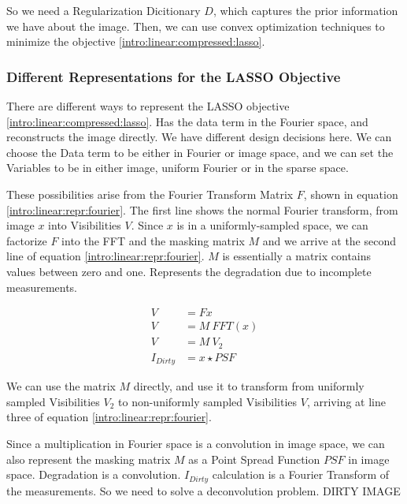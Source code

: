 So we need a Regularization Dicitionary $D$, which captures the prior information we have about the image. Then, we can use convex optimization techniques to minimize the objective \eqref{intro:linear:compressed:lasso}.






\subsubsection{Different Representations for the LASSO Objective}\label{intro:linear:repr}

There are different ways to represent the LASSO objective \eqref{intro:linear:compressed:lasso}. Has the data term in the Fourier space, and reconstructs the image directly. We have different design decisions here. We can choose the Data term to be either in Fourier or image space, and we can set the Variables to be in either image, uniform Fourier or in the sparse space.

These possibilities arise from the Fourier Transform Matrix $F$, shown in equation \eqref{intro:linear:repr:fourier}. The first line shows the normal Fourier transform, from image $x$ into Visibilities $V$. Since $x$ is in a uniformly-sampled space, we can factorize $F$ into the FFT and the masking matrix $M$ and we arrive at the second line of equation \eqref{intro:linear:repr:fourier}. $M$ is essentially a matrix contains values between zero and one.
Represents the degradation due to incomplete measurements. 

\begin{equation} \label{intro:linear:repr:fourier}
\begin{split}
V &= Fx\\
V &= M\: FFT(x)\\
V &= M\: V_2\\
I_{Dirty} &= x \star PSF
\end{split}
\end{equation}

We can use the matrix $M$ directly, and use it to transform from uniformly sampled Visibilities $V_2$ to non-uniformly sampled Visibilities $V$, arriving at line three of equation \eqref{intro:linear:repr:fourier}.

Since a multiplication in Fourier space is a convolution in image space, we can also represent the masking matrix $M$ as a Point Spread Function $PSF$ in image space. Degradation is a convolution. $I_{Dirty}$ calculation is a Fourier Transform of the measurements. So we need to solve a deconvolution problem.
DIRTY IMAGE

